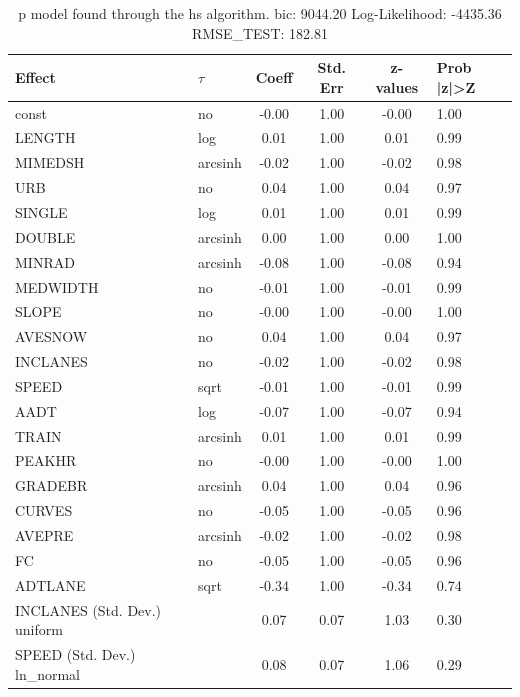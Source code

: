 \begin{table}
	\caption{p model found through the hs algorithm. bic: 9044.20 Log-Likelihood: -4435.36 RMSE_TEST: 182.81}
	\begin{center}
		\begin{tabular}{|l|l|c|c|c|l|}
			\hline
			Effect & $\tau$ & Coeff & Std. Err & z-values & Prob |z|>Z \\
			\hline
			const & no & -0.00 & 1.00 & -0.00 & 1.00 \\
			\hline
			LENGTH & log & 0.01 & 1.00 & 0.01 & 0.99 \\
			\hline
			MIMEDSH & arcsinh & -0.02 & 1.00 & -0.02 & 0.98 \\
			\hline
			URB & no & 0.04 & 1.00 & 0.04 & 0.97 \\
			\hline
			SINGLE & log & 0.01 & 1.00 & 0.01 & 0.99 \\
			\hline
			DOUBLE & arcsinh & 0.00 & 1.00 & 0.00 & 1.00 \\
			\hline
			MINRAD & arcsinh & -0.08 & 1.00 & -0.08 & 0.94 \\
			\hline
			MEDWIDTH & no & -0.01 & 1.00 & -0.01 & 0.99 \\
			\hline
			SLOPE & no & -0.00 & 1.00 & -0.00 & 1.00 \\
			\hline
			AVESNOW & no & 0.04 & 1.00 & 0.04 & 0.97 \\
			\hline
			INCLANES & no & -0.02 & 1.00 & -0.02 & 0.98 \\
			\hline
			SPEED & sqrt & -0.01 & 1.00 & -0.01 & 0.99 \\
			\hline
			AADT & log & -0.07 & 1.00 & -0.07 & 0.94 \\
			\hline
			TRAIN & arcsinh & 0.01 & 1.00 & 0.01 & 0.99 \\
			\hline
			PEAKHR & no & -0.00 & 1.00 & -0.00 & 1.00 \\
			\hline
			GRADEBR & arcsinh & 0.04 & 1.00 & 0.04 & 0.96 \\
			\hline
			CURVES & no & -0.05 & 1.00 & -0.05 & 0.96 \\
			\hline
			AVEPRE & arcsinh & -0.02 & 1.00 & -0.02 & 0.98 \\
			\hline
			FC & no & -0.05 & 1.00 & -0.05 & 0.96 \\
			\hline
			ADTLANE & sqrt & -0.34 & 1.00 & -0.34 & 0.74 \\
			\hline
			INCLANES (Std. Dev.) uniform &  & 0.07 & 0.07 & 1.03 & 0.30 \\
			\hline
			SPEED (Std. Dev.) ln_normal &  & 0.08 & 0.07 & 1.06 & 0.29 \\

\end{tabular}
\end{center}
\end{table}
